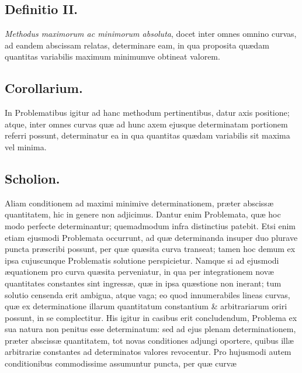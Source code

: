 \subsection*{Definitio II.}
\textit{Methodus maximorum ac minimorum absoluta}, docet inter omnes omnino curvas, ad eandem abscissam relatas, determinare eam, in qua proposita quædam quantitas variabilis maximum minimumve obtineat valorem.

\subsection*{Corollarium.}
In Problematibus igitur ad hanc methodum pertinentibus, datur axis positione; atque, inter omnes curvas quæ ad hunc axem ejusque determinatam portionem referri possunt, determinatur ea in qua quantitas quædam variabilis sit maxima vel minima.

\subsection*{Scholion.}
Aliam conditionem ad maximi minimive determinationem, præter abscissæ quantitatem, hic in genere non adjicimus. Dantur enim Problemata, quæ hoc modo perfecte determinantur; quemadmodum infra distinctius patebit. Etsi enim etiam ejusmodi Problemata occurrunt, ad quæ determinanda insuper duo plurave puncta præscribi possunt, per quæ quæsita curva transeat; tamen hoc demum ex ipsa cujuscunque Problematis solutione perspicietur. Namque si ad ejusmodi æquationem pro curva quæsita perveniatur, in qua per integrationem novæ quantitates constantes sint ingressæ, quæ in ipsa quæstione non inerant; tum solutio censenda erit ambigua, atque vaga; eo quod innumerabiles lineas curvas, quæ ex determinatione illarum quantitatum constantium \& arbitrariarum oriri possunt, in se complectitur. His igitur in casibus erit concludendum, Problema ex sua natura non penitus esse determinatum: sed ad ejus plenam determinationem, præter abscissæ quantitatem, tot novas conditiones adjungi oportere, quibus illæ arbitrariæ constantes ad determinatos valores revocentur. Pro hujusmodi autem conditionibus commodissime assumuntur puncta, per quæ curvæ
